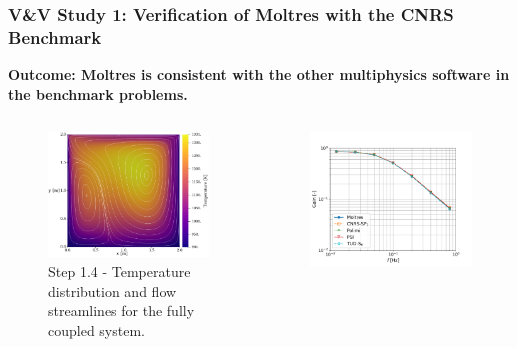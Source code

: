 \begin{frame}
  \frametitle{V\&V Study 1: Verification of Moltres with the CNRS Benchmark}
  \textbf{Outcome: Moltres is consistent with the other multiphysics software in the benchmark
  problems.}
  \begin{columns}
    \hfill
    \column[t]{4cm}
    \vspace{.3cm}
    \begin{figure}
      \centering
      \includegraphics[width=\columnwidth]{../images/full-coupled}
      \caption{Step 1.4 - Temperature distribution and flow streamlines for the fully
        coupled system.}
    \end{figure}
    \column[t]{4cm}
    \begin{figure}
      \centering
      \includegraphics[width=\columnwidth]{../images/2-1-gain-plot}

\end{figure}
\end{columns}
\end{frame}

